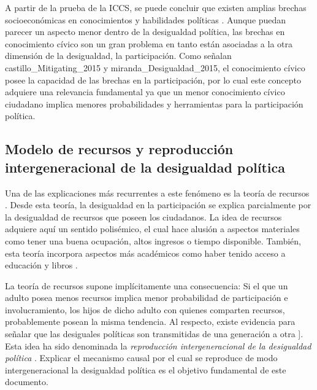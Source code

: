 \documentclass[12pt,twoside]{templates/facsothesis}
\begin{document}
A partir de la prueba de la ICCS, se puede concluir que existen amplias brechas socioeconómicas en conocimientos y habilidades políticas \citep{ace_Informe_2018, schulz_Initial_2010, trevino_Influence_2017}. Aunque puedan parecer un aspecto menor dentro de la desigualdad política, las brechas en conocimiento cívico son un gran problema en tanto están asociadas a la otra dimensión de la desigualdad, la participación. Como señalan castillo\_Mitigating\_2015 y miranda\_Desigualdad\_2015, el conocimiento cívico posee la capacidad de las brechas en la participación, por lo cual este concepto adquiere una relevancia fundamental ya que un menor conocimiento cívico ciudadano implica menores probabilidades y herramientas para la participación política.

\hypertarget{modelo-de-recursos-y-reproducciuxf3n-intergeneracional-de-la-desigualdad-poluxedtica}{%
\subsection{Modelo de recursos y reproducción intergeneracional de la desigualdad política}\label{modelo-de-recursos-y-reproducciuxf3n-intergeneracional-de-la-desigualdad-poluxedtica}}

Una de las explicaciones más recurrentes a este fenómeno es la teoría de recursos \citep{schlozman_Unequal_2018}. Desde esta teoría, la desigualdad en la participación se explica parcialmente por la desigualdad de recursos que poseen los ciudadanos. La idea de recursos adquiere aquí un sentido polisémico, el cual hace alusión a aspectos materiales como tener una buena ocupación, altos ingresos o tiempo disponible. También, esta teoría incorpora aspectos más académicos como haber tenido acceso a educación y libros \citep{miranda_Desigualdad_2018}.

La teoría de recursos supone implícitamente una consecuencia: Si el que un adulto posea menos recursos implica menor probabilidad de participación e involucramiento, los hijos de dicho adulto con quienes comparten recursos, probablemente posean la misma tendencia. Al respecto, existe evidencia para señalar que las desiguales políticas son transmitidas de una generación a otra \citet{brady_Political_2015}{]}. Esta idea ha sido denominada la \emph{reproducción intergeneracional de la desigualdad política} \citep{miranda_Desigualdad_2018}. Explicar el mecanismo causal por el cual se reproduce de modo intergeneracional la desigualdad política es el objetivo fundamental de este documento.
\end{document}
